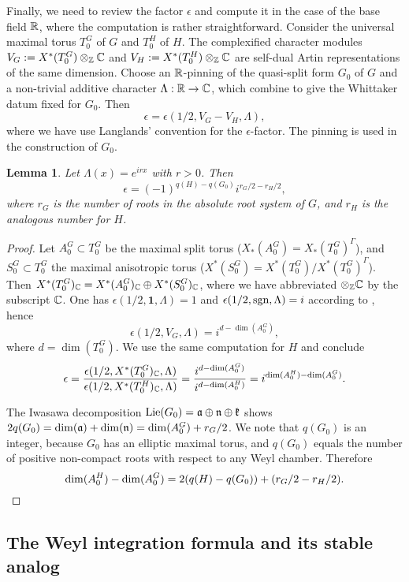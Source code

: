 \documentclass{article}
\newtheorem{lem}[thm]{Lemma}
\theoremstyle{definition}
\numberwithin{equation}{section}
\renewcommand{\-}{\hyp{}}
\begin{document}
Finally, we  need to review the factor $\epsilon$ and compute it in the case of the base field $\mathbb{R}$, where the computation is rather straightforward. Consider the universal maximal torus $T_0^G$ of $G$ and $T_0^H$ of $H$. The complexified character modules $V_G := X^*(T_0^G)\otimes_{\mathbb{Z}}\mathbb{C}$ and $V_H := X^*(T_0^H)\otimes_{\mathbb{Z}}\mathbb{C}$ are self-dual Artin representations of the same dimension. Choose an $\mathbb{R}$-pinning of the quasi-split form $G_0$ of $G$ and a non-trivial additive character $\Lambda : \mathbb{R} \to \mathbb{C}$, which combine to give the Whittaker datum fixed for $G_0$. Then
\[ \epsilon = \epsilon(1/2,V_G-V_H,\Lambda), \]
where we have use Langlands' convention \cite[(3.6.4)]{TateCor} for the $\epsilon$-factor. The pinning is used in the construction of $G_0$.


\begin{lem} \label{lem:epsilon}
Let $\Lambda(x)=e^{irx}$ with $r>0$. Then
\[ \epsilon = (-1)^{q(H)-q(G_0)}i^{r_G/2-r_H/2}, \]
where $r_G$ is the number of roots in the absolute root system of $G$, and $r_H$ is the analogous number for $H$.
\end{lem}
\begin{proof}
Let $A_0^G \subset T_0^G$ be the maximal split torus ($X_*(A_0^G)=X_*(T_0^G)^\Gamma$), and $S_0^G \subset T_0^G$ the maximal anisotropic torus ($X^*(S_0^G)=X^*(T_0^G)/X^*(T_0^G)^\Gamma$). Then $X^*(T_0^G)_{\mathbb{C}}=X^*(A_0^G)_{\mathbb{C}} \oplus X^*(S_0^G)_{\mathbb{C}}$, where we have abbreviated $\otimes_{\mathbb{Z}}\mathbb{C}$ by the subscript $\mathbb{C}$. One has $\epsilon(1/2,\textbf{1},\Lambda)=1$ and $\epsilon(1/2,\textrm{sgn},\Lambda)=i$ according to \cite[(3.2.4)]{TateCor}, hence
\[ \epsilon(1/2,V_G,\Lambda)=i^{d-\dim(A_0^G)}, \]
where $d=\dim(T_0^G)$. We use the same computation for $H$ and conclude
\[ \epsilon=\frac{\epsilon(1/2,X^*(T_0^G)_{\mathbb{C}},\Lambda)}{\epsilon(1/2,X^*(T_0^H)_{\mathbb{C}},\Lambda)} = \frac{i^{d-\dim(A_0^G)}}{i^{d-\dim(A_0^H)}}=i^{\dim(A_0^H)-\dim(A_0^G)}. \]

The Iwasawa decomposition $\textrm{Lie}(G_0)=\mathfrak{a} \oplus\mathfrak{n} \oplus \mathfrak{k}$ shows  $2q(G_0)=\dim(\mathfrak{a})+\dim(\mathfrak{n})=\dim(A_0^G)+r_G/2$. We note that $q(G_0)$ is an integer, because $G_0$ has an elliptic maximal torus, and $q(G_0)$ equals the number of positive non-compact roots with respect to any Weyl chamber. Therefore
\[ \dim(A_0^H)-\dim(A_0^G) = 2(q(H)-q(G_0))+(r_G/2-r_H/2).\qedhere \]
\end{proof}


\subsection{The Weyl integration formula and its stable analog} \label{sub:weylint}
\end{document}
